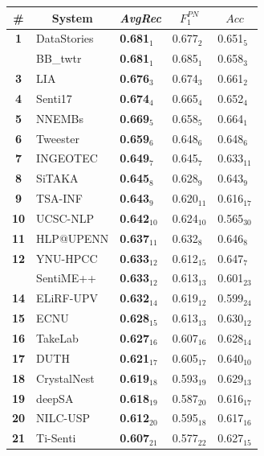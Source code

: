\begin{table}[h!]
\centering
\begin{small}
\renewcommand{\arraystretch}{1.0}%
\begin{tabular}{|c|l|l|l|l|}
\hline
      \bf \# & \multicolumn{1}{c|}{\bf System} & \multicolumn{1}{c|}{\it AvgRec} & \multicolumn{1}{c|}{$F_{1}^{PN}$} & \multicolumn{1}{c|}{$Acc$} \\
\hline
\bf 1 & DataStories & \bf 0.681$_{1}$ & 0.677$_{2}$ & 0.651$_{5}$ \\
& BB\_twtr & \bf 0.681$_{1}$ & 0.685$_{1}$ & 0.658$_{3}$ \\
\bf 3 & LIA & \bf 0.676$_{3}$ & 0.674$_{3}$ & 0.661$_{2}$ \\
\bf 4 & Senti17 & \bf 0.674$_{4}$ & 0.665$_{4}$ & 0.652$_{4}$ \\
\bf 5 & NNEMBs & \bf 0.669$_{5}$ & 0.658$_{5}$ & 0.664$_{1}$ \\
\bf 6 & Tweester & \bf 0.659$_{6}$ & 0.648$_{6}$ & 0.648$_{6}$ \\
\bf 7 & INGEOTEC & \bf 0.649$_{7}$ & 0.645$_{7}$ & 0.633$_{11}$ \\
\bf 8 & SiTAKA & \bf 0.645$_{8}$ & 0.628$_{9}$ & 0.643$_{9}$ \\
\bf 9 & TSA-INF & \bf 0.643$_{9}$ & 0.620$_{11}$ & 0.616$_{17}$ \\
\bf 10 & UCSC-NLP & \bf 0.642$_{10}$ & 0.624$_{10}$ & 0.565$_{30}$ \\
\bf 11 & HLP@UPENN & \bf 0.637$_{11}$ & 0.632$_{8}$ & 0.646$_{8}$ \\
\bf 12 & YNU-HPCC & \bf 0.633$_{12}$ & 0.612$_{15}$ & 0.647$_{7}$ \\
& SentiME++ & \bf 0.633$_{12}$ & 0.613$_{13}$ & 0.601$_{23}$ \\
\bf 14 & ELiRF-UPV & \bf 0.632$_{14}$ & 0.619$_{12}$ & 0.599$_{24}$ \\
\bf 15 & ECNU & \bf 0.628$_{15}$ & 0.613$_{13}$ & 0.630$_{12}$ \\
\bf 16 & TakeLab & \bf 0.627$_{16}$ & 0.607$_{16}$ & 0.628$_{14}$ \\
\bf 17 & DUTH & \bf 0.621$_{17}$ & 0.605$_{17}$ & 0.640$_{10}$ \\
\bf 18 & CrystalNest & \bf 0.619$_{18}$ & 0.593$_{19}$ & 0.629$_{13}$ \\
\bf 19 & deepSA & \bf 0.618$_{19}$ & 0.587$_{20}$ & 0.616$_{17}$ \\
\bf 20 & NILC-USP & \bf 0.612$_{20}$ & 0.595$_{18}$ & 0.617$_{16}$ \\
\bf 21 & Ti-Senti & \bf 0.607$_{21}$ & 0.577$_{22}$ & 0.627$_{15}$ \\

\end{tabular}
\end{small}
\end{table}
